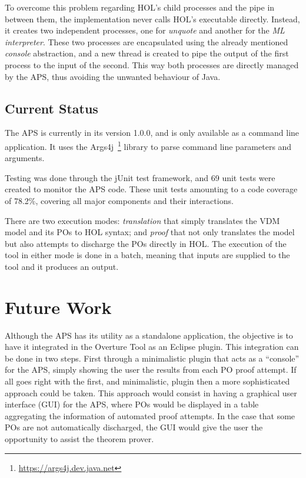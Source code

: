 \documentclass[]{article}
\begin{document}
To overcome this problem regarding HOL's child processes and the pipe in between them, the implementation never calls HOL's executable directly.
Instead, it creates two independent processes, one for \emph{unquote} and another for the \emph{ML interpreter}.
These two processes are encapsulated using the already mentioned \emph{console} abstraction, and a new thread is created to pipe the output of the first process to the input of the second.
This way both processes are directly managed by the APS, thus avoiding the unwanted behaviour of Java.

\subsection{Current Status}

The APS is currently in its version 1.0.0, and is only available as a command line application.
It uses the Args4j~\footnote{\url{https://args4j.dev.java.net}} library to parse command line parameters and arguments.

Testing was done through the jUnit test framework, and 69 unit tests were created to monitor the APS code.
These unit tests amounting to a code coverage of 78.2\%, covering all major components and their interactions.

There are two execution modes: \emph{translation} that simply translates the VDM model and its POs to HOL syntax; and \emph{proof} that not only translates the model but also attempts to discharge the POs directly in HOL.
The execution of the tool in either mode is done in a batch, meaning that inputs are supplied to the tool and it produces an output.

\section{Future Work}
\label{sec:future_work}

Although the APS has its utility as a standalone application, the objective is to have it integrated in the Overture Tool as an Eclipse plugin.
This integration can be done in two steps. 
First through a minimalistic plugin that acts as a ``console'' for the APS, simply showing the user the results from each PO proof attempt.
If all goes right with the first, and minimalistic, plugin then a more sophisticated approach could be taken.
This approach would consist in having a graphical user interface (GUI) for the APS, where POs would be displayed in a table aggregating the information of automated proof attempts.
In the case that some POs are not automatically discharged, the GUI would give the user the opportunity to assist the theorem prover.
\end{document}
